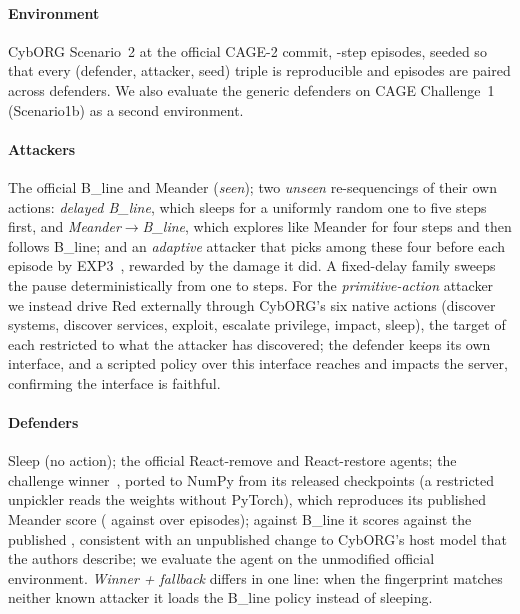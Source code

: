 \documentclass[conference,compsoc]{IEEEtran}
\begin{document}
\paragraph{Environment}
CybORG Scenario~2 at the official CAGE-2 commit, \CgSteps-step episodes, seeded so that
every (defender, attacker, seed) triple is reproducible and episodes are paired across
defenders. We also evaluate the generic defenders on CAGE Challenge~1 (Scenario1b) as a
second environment.

\paragraph{Attackers}
The official B\_line and Meander (\emph{seen}); two \emph{unseen} re-sequencings of their
own actions: \emph{delayed B\_line}, which sleeps for a uniformly random one to five
steps first, and \emph{Meander$\to$B\_line}, which explores like Meander for four steps
and then follows B\_line; and an \emph{adaptive} attacker that picks among these four
before each episode by EXP3~\cite{auer2002exp3}, rewarded by the damage it did. A
fixed-delay family sweeps the pause deterministically from one to \FamDelays{} steps. For
the \emph{primitive-action} attacker we instead drive Red externally through CybORG's six
native actions (discover systems, discover services, exploit, escalate privilege, impact,
sleep), the target of each restricted to what the attacker has discovered; the defender
keeps its own interface, and a scripted policy over this interface reaches and impacts the
server, confirming the interface is faithful.

\paragraph{Defenders}
Sleep (no action); the official React-remove and React-restore agents; the challenge
winner~\cite{hannay2022cardiff}, ported to NumPy from its released checkpoints (a
restricted unpickler reads the weights without PyTorch), which reproduces its published
Meander score (\CgValMeanderPort{} against \CgValMeanderPub{} over
\CgValEpisodes{} episodes); against B\_line it scores \CgValBlinePort{} against the
published \CgValBlinePub, consistent with an unpublished change to CybORG's host model
that the authors describe; we evaluate the agent on the unmodified official environment.
\emph{Winner + fallback} differs in one line: when the fingerprint matches neither known
attacker it loads the B\_line policy instead of sleeping.
\end{document}
